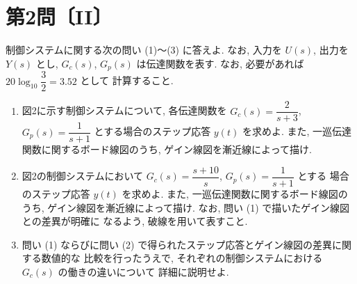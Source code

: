 
\section*{第2問〔II〕}

制御システムに関する次の問い (1)〜(3) に答えよ. なお, 入力を $U(s)$, 出力を $Y(s)$ とし,
$G_c(s)$, $G_p(s)$ は伝達関数を表す. なお, 必要があれば $20\log_{10}\dfrac{3}{2}=3.52$ として
計算すること.

\begin{center}
\end{center}

\begin{enumerate}[label=(\arabic*)]
  \item 図2に示す制御システムについて, 各伝達関数を $G_c(s)=\dfrac{2}{s+3}$,
        $G_p(s)=\dfrac{1}{s+1}$ とする場合のステップ応答 $y(t)$ を求めよ. また,
        一巡伝達関数に関するボード線図のうち, ゲイン線図を漸近線によって描け.

  \item 図2の制御システムにおいて $G_c(s)=\dfrac{s+10}{s}$, $G_p(s)=\dfrac{1}{s+1}$ とする
        場合のステップ応答 $y(t)$ を求めよ. また, 一巡伝達関数に関するボード線図のうち,
        ゲイン線図を漸近線によって描け. なお, 問い (1) で描いたゲイン線図との差異が明確に
        なるよう, 破線を用いて表すこと.

  \item 問い (1) ならびに問い (2) で得られたステップ応答とゲイン線図の差異に関する数値的な
        比較を行ったうえで, それぞれの制御システムにおける $G_c(s)$ の働きの違いについて
        詳細に説明せよ.
\end{enumerate}
